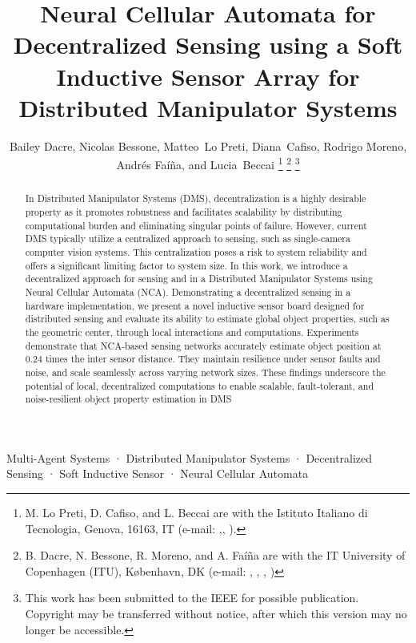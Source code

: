 \documentclass[conference]{IEEEtran}
\begin{document}


\title{Neural Cellular Automata for Decentralized Sensing using a Soft Inductive Sensor Array for Distributed Manipulator Systems\\
}
\author{
Bailey Dacre,
Nicolas Bessone,
Matteo~Lo Preti,
Diana~Cafiso,
Rodrigo Moreno,\\
Andrés Faíña,
and Lucia~Beccai
\thanks{M. Lo Preti, D. Cafiso, and L. Beccai are with the Istituto Italiano di Tecnologia, Genova, 16163, IT (e-mail:  ,, ).}
\thanks{B. Dacre, N. Bessone, R. Moreno, and A. Faíña are with the IT University of Copenhagen (ITU), København, DK (e-mail: , , , )}
\thanks{This work has been submitted to the IEEE for possible publication. Copyright may be transferred without notice, after which this version may no longer be accessible.}
}
\maketitle

\begin{abstract}
In Distributed Manipulator Systems (DMS), decentralization is a highly desirable property as it promotes robustness and facilitates scalability by distributing computational burden and eliminating singular points of failure. However, current DMS typically utilize a centralized approach to sensing, such as single-camera computer vision systems. This centralization poses a risk to system reliability and offers a significant limiting factor to system size. In this work, we introduce a decentralized approach for sensing and in a Distributed Manipulator Systems using Neural Cellular Automata (NCA). Demonstrating a decentralized sensing in a hardware implementation, we present a novel inductive sensor board designed for distributed sensing and evaluate its ability to estimate global object properties, such as the geometric center, through local interactions and computations. Experiments demonstrate that NCA-based sensing networks accurately estimate object position at 0.24 times the inter sensor distance. They maintain resilience under sensor faults and noise, and scale seamlessly across varying network sizes. These findings underscore the potential of local, decentralized computations to enable scalable, fault-tolerant, and noise-resilient object property estimation in DMS
\end{abstract}


\begin{IEEEkeywords}
Multi-Agent Systems · Distributed Manipulator Systems · Decentralized Sensing · Soft Inductive Sensor · Neural Cellular Automata 
\end{IEEEkeywords}















\end{document}
